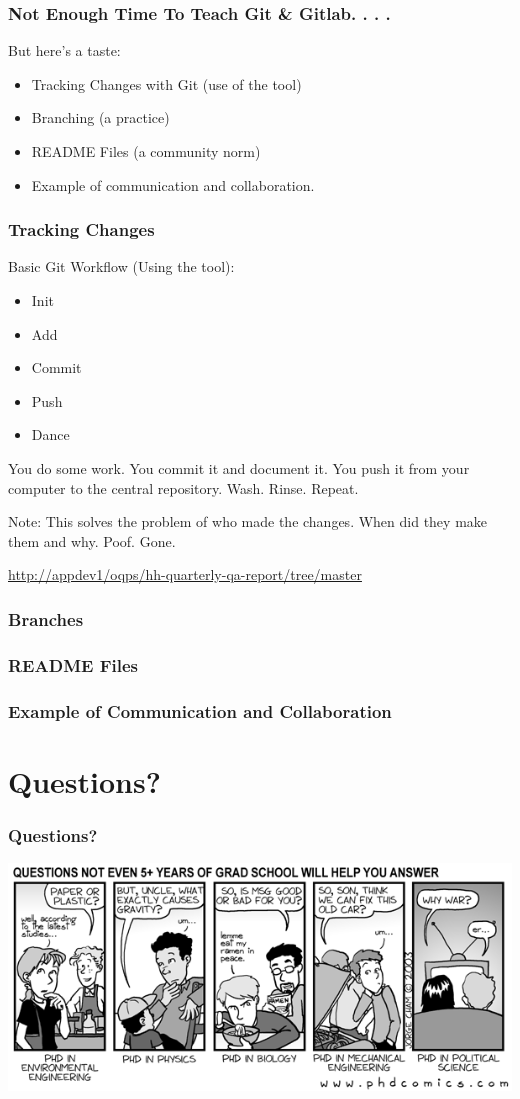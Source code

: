 \documentclass{beamer}
\begin{document}
\begin{frame}
  \frametitle{Not Enough Time To Teach Git \& Gitlab. . . . }
  But here's a taste:
  \bigskip

  \begin{itemize}
  \item Tracking Changes with Git (use of the tool)
  \item Branching (a practice)
  \item README Files (a community norm)
  \item Example of communication and collaboration.
  \end{itemize}
\end{frame}

\begin{frame}
  \frametitle{Tracking Changes}

  Basic Git Workflow (Using the tool):
  \bigskip

  \begin{itemize}
  \item Init
  \item Add
  \item Commit
  \item Push
  \item Dance
  \end{itemize}

  \bigskip
  You do some work. You commit it and document it. You push it from
  your computer to the central repository. Wash. Rinse. Repeat.

  Note: This solves the problem of who made the changes. When did they make
  them and why. Poof. Gone.
  
  {\tiny {\url{http://appdev1/oqps/hh-quarterly-qa-report/tree/master}}}
  
\end{frame}

\begin{frame}
  \frametitle{Branches}
  
\end{frame}

\begin{frame}
  \frametitle{README Files}
  
\end{frame}

\begin{frame}
  \frametitle{Example of Communication and Collaboration}
  
\end{frame}
\section{Questions?}

\begin{frame}
 \frametitle{Questions?}
 \includegraphics[width=\textwidth]{./img/questions.png}
\end{frame}
\end{document}
